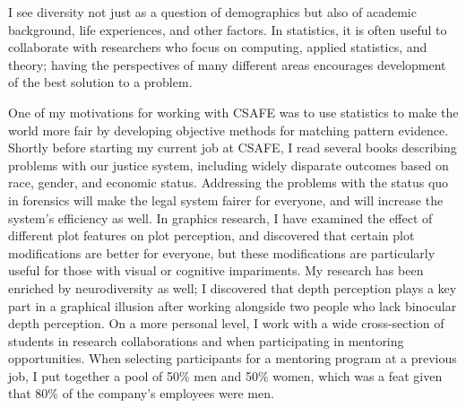\documentclass[12pt, letterpaper, sans]{moderncv}
\begin{document}
I see diversity not just as a question of demographics but also of academic background, life experiences, and other factors. In statistics, it is often useful to collaborate with researchers who focus on computing, applied statistics, and theory; having the perspectives of many different areas encourages development of the best solution to a problem. 
 
One of my motivations for working with CSAFE was to use statistics to make the world more fair by developing objective methods for matching pattern evidence. Shortly before starting my current job at CSAFE, I read several books describing problems with our justice system, including widely disparate outcomes based on race, gender, and economic status. Addressing the problems with the status quo in forensics will make the legal system fairer for everyone, and will increase the system's efficiency as well. In graphics research, I have examined the effect of different plot features on plot perception, and discovered that  certain plot modifications are better for everyone, but these modifications are particularly useful for those with visual or cognitive impariments. My research has been enriched by neurodiversity as well; I discovered that depth perception plays a key part in a graphical illusion after working alongside two people who lack binocular depth perception. On a more personal level, I work with a wide cross-section of students in research collaborations and when participating in mentoring opportunities. When selecting participants for a mentoring program at a previous job, I put together a pool of 50\% men and 50\% women, which was a feat given that 80\% of the company's employees were men.
\end{document}
